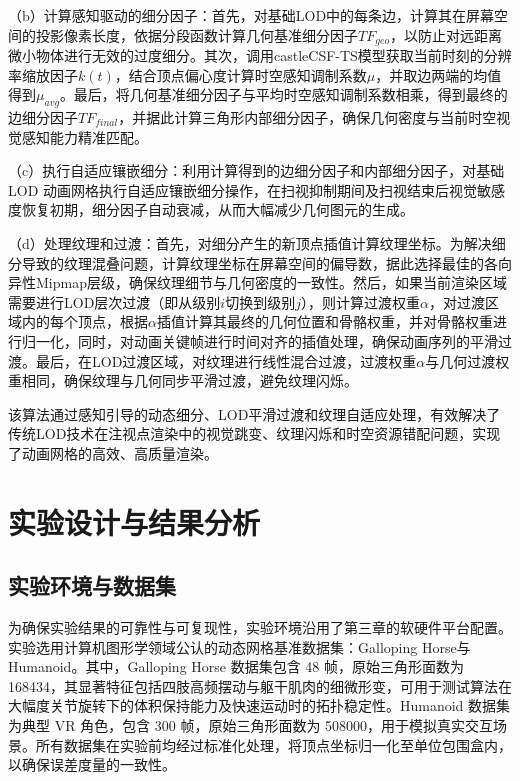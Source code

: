 （b）计算感知驱动的细分因子：首先，对基础LOD中的每条边，计算其在屏幕空间的投影像素长度，依据分段函数计算几何基准细分因子$TF_{geo}$，以防止对远距离微小物体进行无效的过度细分。其次，调用castleCSF-TS模型获取当前时刻的分辨率缩放因子$k(t)$，结合顶点偏心度计算时空感知调制系数$\mu$，并取边两端的均值得到$\mu_{avg}$。最后，将几何基准细分因子与平均时空感知调制系数相乘，得到最终的边细分因子$TF_{final}$，并据此计算三角形内部细分因子，确保几何密度与当前时空视觉感知能力精准匹配。




（c）执行自适应镶嵌细分：利用计算得到的边细分因子和内部细分因子，对基础LOD 动画网格执行自适应镶嵌细分操作，在扫视抑制期间及扫视结束后视觉敏感度恢复初期，细分因子自动衰减，从而大幅减少几何图元的生成。

（d）处理纹理和过渡：首先，对细分产生的新顶点插值计算纹理坐标。为解决细分导致的纹理混叠问题，计算纹理坐标在屏幕空间的偏导数，据此选择最佳的各向异性Mipmap层级，确保纹理细节与几何密度的一致性。然后，如果当前渲染区域需要进行LOD层次过渡（即从级别$i$切换到级别$j$），则计算过渡权重$\alpha$，对过渡区域内的每个顶点，根据$\alpha$插值计算其最终的几何位置和骨骼权重，并对骨骼权重进行归一化，同时，对动画关键帧进行时间对齐的插值处理，确保动画序列的平滑过渡。最后，在LOD过渡区域，对纹理进行线性混合过渡，过渡权重$\alpha$与几何过渡权重相同，确保纹理与几何同步平滑过渡，避免纹理闪烁。

该算法通过感知引导的动态细分、LOD平滑过渡和纹理自适应处理，有效解决了传统LOD技术在注视点渲染中的视觉跳变、纹理闪烁和时空资源错配问题，实现了动画网格的高效、高质量渲染。



\section{实验设计与结果分析}


\subsection{实验环境与数据集}
为确保实验结果的可靠性与可复现性，实验环境沿用了第三章的软硬件平台配置。
实验选用计算机图形学领域公认的动态网格基准数据集：Galloping Horse与Humanoid。其中，Galloping Horse 数据集\cite{4-3-1-1}包含 48 帧，原始三角形面数为 168434，其显著特征包括四肢高频摆动与躯干肌肉的细微形变，可用于测试算法在大幅度关节旋转下的体积保持能力及快速运动时的拓扑稳定性。Humanoid 数据集为典型 VR 角色，包含 300 帧，原始三角形面数为 508000，用于模拟真实交互场景。所有数据集在实验前均经过标准化处理，将顶点坐标归一化至单位包围盒内，以确保误差度量的一致性。

